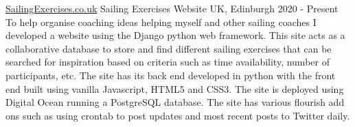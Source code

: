 

    \cventry
        {\href{www.sailingexercises.co.uk}{SailingExercises.co.uk}}
        {Sailing Exercises Website}
        {UK, Edinburgh}
        {2020 - Present}
        {
        To help organise coaching ideas helping myself and other sailing coaches I developed a website using the Django python web framework. This site acts as a collaborative database to store and find different sailing exercises that can be searched for inspiration based on criteria such as time availability, number of participants, etc. The site has its back end developed in python with the front end built using vanilla Javascript, HTML5 and CSS3. The site is deployed using Digital Ocean running a PostgreSQL database. The site has various flourish add ons such as using crontab to post updates and most recent posts to Twitter daily.\newline
        }
